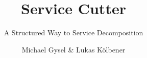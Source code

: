 \documentclass[hsr-ba,english]{hgbthesis}
\begin{document}

\bigskipamount=30pt

\title{Service Cutter}
\subtitle{A Structured Way to Service Decomposition}
\author{Michael Gysel \& Lukas K\"{o}lbener}



\frontmatter
\maketitle
\setcounter{tocdepth}{1}
\tableofcontents

			

\mainmatter         %

\makeatletter
\renewcommand{\@makechapterhead}[1]{%
\vspace*{50 pt}%
{\setlength{\parindent}{0pt} \raggedright \normalfont
\bfseries\Huge\thechapter.\ #1
\par\nobreak\vspace{40 pt}}}
\makeatother


















\appendix
\end{document}
